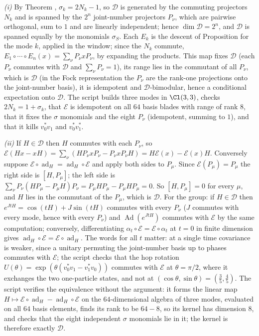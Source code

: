 \emph{(i)} By Theorem , $\sigma_{k} = 2N_{k} - 1$, so $\mathcal{D}$ is generated by the commuting projectors $N_{k}$ and is spanned by the $2^{n}$ joint-number projectors $P_{\nu}$, which are pairwise orthogonal, sum to $1$ and are linearly independent; hence $\dim\mathcal{D} = 2^{n}$, and $\mathcal{D}$ is spanned equally by the monomials $\sigma_{S}$. Each $E_{k}$ is the descent of Proposition  for the mode $k$, applied in the window; since the $N_{k}$ commute, $E_{1}\circ\cdots\circ E_{n}(x) = \sum_{\nu}P_{\nu}xP_{\nu}$, by expanding the products. This map fixes $\mathcal{D}$ (each $P_{\nu}$ commutes with $\mathcal{D}$ and $\sum_{\nu}P_{\nu} = 1$), its range lies in the commutant of all $P_{\nu}$, which is $\mathcal{D}$ (in the Fock representation the $P_{\nu}$ are the rank-one projections onto the joint-number basis), it is idempotent and $\mathcal{D}$-bimodular, hence a conditional expectation onto $\mathcal{D}$. The script builds three modes in $\Cl(3,3)$, checks $2N_{k} = 1 + \sigma_{k}$, that $\mathcal{E}$ is idempotent on all $64$ basis blades with range of rank $8$, that it fixes the $\sigma$ monomials and the eight $P_{\nu}$ (idempotent, summing to $1$), and that it kills $v_{0}^{*}v_{1}$ and $v_{0}^{*}v_{1}^{*}$.

\emph{(ii)} If $H \in \mathcal{D}$ then $H$ commutes with each $P_{\nu}$, so $\mathcal{E}(Hx - xH) = \sum_{\nu}(HP_{\nu}xP_{\nu} - P_{\nu}xP_{\nu}H) = H\mathcal{E}(x) - \mathcal{E}(x)H$. Conversely suppose $\mathcal{E}\circ\operatorname{ad}_{H} = \operatorname{ad}_{H}\circ\mathcal{E}$ and apply both sides to $P_{\mu}$. Since $\mathcal{E}(P_{\mu}) = P_{\mu}$ the right side is $[H, P_{\mu}]$; the left side is $\sum_{\nu}P_{\nu}(HP_{\mu} - P_{\mu}H)P_{\nu} = P_{\mu}HP_{\mu} - P_{\mu}HP_{\mu} = 0$. So $[H, P_{\mu}] = 0$ for every $\mu$, and $H$ lies in the commutant of the $P_{\mu}$, which is $\mathcal{D}$. For the group: if $H \in \mathcal{D}$ then $e^{JtH} = \cos(tH) + J\sin(tH)$ commutes with every $P_{\nu}$ ($J$ commutes with every mode, hence with every $P_{\nu}$) and $\operatorname{Ad}(e^{JtH})$ commutes with $\mathcal{E}$ by the same computation; conversely, differentiating $\alpha_{t}\circ\mathcal{E} = \mathcal{E}\circ\alpha_{t}$ at $t = 0$ in finite dimension gives $\operatorname{ad}_{H}\circ\mathcal{E} = \mathcal{E}\circ\operatorname{ad}_{H}$. The words for all $t$ matter: at a single time covariance is weaker, since a unitary permuting the joint-number basis up to phases commutes with $\mathcal{E}$; the script checks that the hop rotation $U(\theta) = \exp(\theta(v_{0}^{*}v_{1} - v_{1}^{*}v_{0}))$ commutes with $\mathcal{E}$ at $\theta = \pi/2$, where it exchanges the two one-particle states, and not at $(\cos\theta, \sin\theta) = (\tfrac35, \tfrac45)$. The script verifies the equivalence without the argument: it forms the linear map $H \mapsto \mathcal{E}\circ\operatorname{ad}_{H} - \operatorname{ad}_{H}\circ\mathcal{E}$ on the $64$-dimensional algebra of three modes, evaluated on all $64$ basis elements, finds its rank to be $64 - 8$, so its kernel has dimension $8$, and checks that the eight independent $\sigma$ monomials lie in it; the kernel is therefore exactly $\mathcal{D}$.

